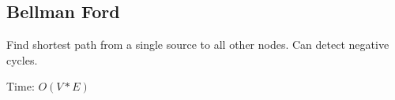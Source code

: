 \subsection{Bellman Ford}
Find shortest path from a single source to all other nodes. Can detect negative cycles.

Time: $O(V * E)$
